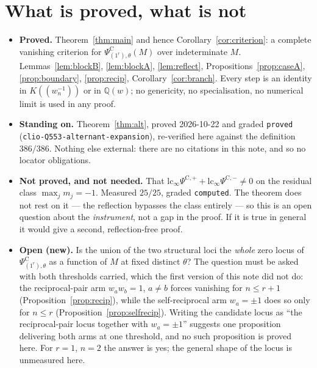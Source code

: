 \documentclass[11pt]{article}
\theoremstyle{definition}
\newcommand{\PsiC}{\Psi^{\mathrm{C}}}
\newcommand{\PsiCs}[1]{\Psi^{\mathrm{C},#1}}
\begin{document}
\section{What is proved, what is not}

\begin{itemize}
\item \textbf{Proved.} Theorem~\ref{thm:main} and hence
  Corollary~\ref{cor:criterion}: a complete vanishing criterion for
  $\PsiC_{(1^r),\theta}(M)$ over indeterminate $M$. Lemmas~\ref{lem:blockB},
  \ref{lem:blockA}, \ref{lem:reflect}, Propositions~\ref{prop:caseA}, \ref{prop:boundary},
  \ref{prop:recip}, Corollary~\ref{cor:branch}. Every step is an identity in
  $K((w_n^{-1}))$ or in $\mathbb{Q}(w)$; no genericity, no specialisation, no numerical
  limit is used in any proof.
\item \textbf{Standing on.} Theorem~\ref{thm:alt}, proved 2026-10-22 and graded
  \texttt{proved} (\texttt{clio-Q553-alternant-expansion}), re-verified here against the
  definition $386/386$. Nothing else external: there are no citations in this note, and so
  no locator obligations.
\item \textbf{Not proved, and not needed.} That $\mathrm{lc}_\infty\PsiCs{+}+
  \mathrm{lc}_\infty\PsiCs{-}\ne0$ on the residual class $\max_jm_j=-1$. Measured $25/25$,
  graded \texttt{computed}. The theorem does not rest on it --- the reflection bypasses the
  class entirely --- so this is an open question about the \emph{instrument}, not a gap in
  the proof. If it is true in general it would give a second, reflection-free proof.
\item \textbf{Open (new).} Is the union of the two structural loci the \emph{whole} zero
  locus of $\PsiC_{(1^r),\theta}$ as a function of $M$ at fixed distinct $\theta$? The
  question must be asked with both thresholds carried, which the first version of this
  note did not do: the reciprocal-pair arm $w_aw_b=1$, $a\ne b$ forces vanishing for
  $n\le r+1$ (Proposition~\ref{prop:recip}), while the self-reciprocal arm $w_a=\pm1$
  does so only for $n\le r$ (Proposition~\ref{prop:selfrecip}). Writing the candidate
  locus as ``the reciprocal-pair locus together with $w_a=\pm1$'' suggests one
  proposition delivering both arms at one threshold, and no such proposition is proved
  here. For $r=1$, $n=2$ the answer is yes; the general shape of the locus is unmeasured
  here.
\end{itemize}
\end{document}
